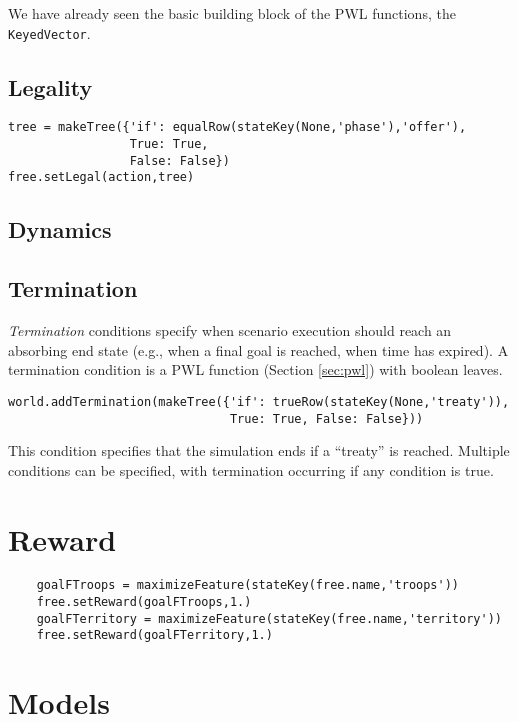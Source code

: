 \documentclass{article}
\begin{document}
We have already seen the basic building block of the PWL functions, the {\tt KeyedVector}. 

\subsection{Legality}\label{sec:legality}

\begin{verbatim}
tree = makeTree({'if': equalRow(stateKey(None,'phase'),'offer'),
                 True: True,    
                 False: False})
free.setLegal(action,tree)
\end{verbatim}

\subsection{Dynamics}\label{sec:dynamics}

\subsection{Termination}

{\em Termination} conditions specify when scenario execution should reach an absorbing end state (e.g., when a final goal is reached, when time has expired). A termination condition is a PWL function (Section \ref{sec:pwl}) with boolean leaves.

\begin{verbatim}
world.addTermination(makeTree({'if': trueRow(stateKey(None,'treaty')),
                               True: True, False: False}))
\end{verbatim}

This condition specifies that the simulation ends if a ``treaty'' is reached. Multiple conditions can be specified, with termination occurring if any condition is true.


\section{Reward}

\begin{verbatim}
    goalFTroops = maximizeFeature(stateKey(free.name,'troops'))
    free.setReward(goalFTroops,1.)
    goalFTerritory = maximizeFeature(stateKey(free.name,'territory'))
    free.setReward(goalFTerritory,1.)
\end{verbatim}

\section{Models}
\end{document}
